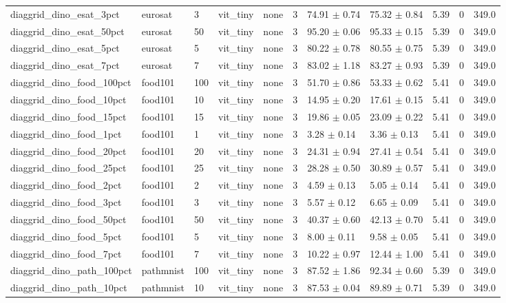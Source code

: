 \begin{tabular}{lllllllllll}
diaggrid_dino_esat_3pct & eurosat & 3 & vit_tiny & none & 3 & 74.91 $\pm$ 0.74 & 75.32 $\pm$ 0.84 & 5.39 & 0 & 349.0 \\
diaggrid_dino_esat_50pct & eurosat & 50 & vit_tiny & none & 3 & 95.20 $\pm$ 0.06 & 95.33 $\pm$ 0.15 & 5.39 & 0 & 349.0 \\
diaggrid_dino_esat_5pct & eurosat & 5 & vit_tiny & none & 3 & 80.22 $\pm$ 0.78 & 80.55 $\pm$ 0.75 & 5.39 & 0 & 349.0 \\
diaggrid_dino_esat_7pct & eurosat & 7 & vit_tiny & none & 3 & 83.02 $\pm$ 1.18 & 83.27 $\pm$ 0.93 & 5.39 & 0 & 349.0 \\
diaggrid_dino_food_100pct & food101 & 100 & vit_tiny & none & 3 & 51.70 $\pm$ 0.86 & 53.33 $\pm$ 0.62 & 5.41 & 0 & 349.0 \\
diaggrid_dino_food_10pct & food101 & 10 & vit_tiny & none & 3 & 14.95 $\pm$ 0.20 & 17.61 $\pm$ 0.15 & 5.41 & 0 & 349.0 \\
diaggrid_dino_food_15pct & food101 & 15 & vit_tiny & none & 3 & 19.86 $\pm$ 0.05 & 23.09 $\pm$ 0.22 & 5.41 & 0 & 349.0 \\
diaggrid_dino_food_1pct & food101 & 1 & vit_tiny & none & 3 & 3.28 $\pm$ 0.14 & 3.36 $\pm$ 0.13 & 5.41 & 0 & 349.0 \\
diaggrid_dino_food_20pct & food101 & 20 & vit_tiny & none & 3 & 24.31 $\pm$ 0.94 & 27.41 $\pm$ 0.54 & 5.41 & 0 & 349.0 \\
diaggrid_dino_food_25pct & food101 & 25 & vit_tiny & none & 3 & 28.28 $\pm$ 0.50 & 30.89 $\pm$ 0.57 & 5.41 & 0 & 349.0 \\
diaggrid_dino_food_2pct & food101 & 2 & vit_tiny & none & 3 & 4.59 $\pm$ 0.13 & 5.05 $\pm$ 0.14 & 5.41 & 0 & 349.0 \\
diaggrid_dino_food_3pct & food101 & 3 & vit_tiny & none & 3 & 5.57 $\pm$ 0.12 & 6.65 $\pm$ 0.09 & 5.41 & 0 & 349.0 \\
diaggrid_dino_food_50pct & food101 & 50 & vit_tiny & none & 3 & 40.37 $\pm$ 0.60 & 42.13 $\pm$ 0.70 & 5.41 & 0 & 349.0 \\
diaggrid_dino_food_5pct & food101 & 5 & vit_tiny & none & 3 & 8.00 $\pm$ 0.11 & 9.58 $\pm$ 0.05 & 5.41 & 0 & 349.0 \\
diaggrid_dino_food_7pct & food101 & 7 & vit_tiny & none & 3 & 10.22 $\pm$ 0.97 & 12.44 $\pm$ 1.00 & 5.41 & 0 & 349.0 \\
diaggrid_dino_path_100pct & pathmnist & 100 & vit_tiny & none & 3 & 87.52 $\pm$ 1.86 & 92.34 $\pm$ 0.60 & 5.39 & 0 & 349.0 \\
diaggrid_dino_path_10pct & pathmnist & 10 & vit_tiny & none & 3 & 87.53 $\pm$ 0.04 & 89.89 $\pm$ 0.71 & 5.39 & 0 & 349.0 \\

\end{tabular}
